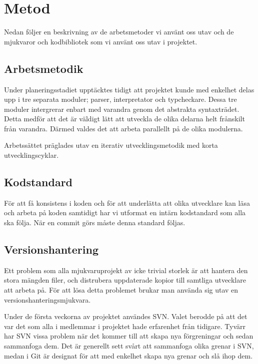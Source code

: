 \section{Metod} 

Nedan följer en beskrivning av de arbetsmetoder vi använt oss utav och de mjukvaror och kodbibliotek som vi använt oss utav i projektet. 

\subsection{Arbetsmetodik}

Under planeringsstadiet upptäcktes tidigt att projektet kunde med enkelhet delas upp i tre separata moduler; parser, interpretator och typcheckare. Dessa tre moduler intergrerar enbart med varandra genom det abstrakta syntaxträdet. Detta medför att det är väldigt lätt att utveckla de olika delarna helt frånskilt från varandra. Därmed valdes det att arbeta parallellt på de olika modulerna. 

Arbetssättet präglades utav en iterativ utvecklingsmetodik med korta utvecklingscyklar.   

\subsection{Kodstandard} 
För att få konsistens i koden och för att underlätta att olika utvecklare kan läsa och arbeta på koden samtidigt har vi utformat en intärn kodstandard \citep{fang01} som alla ska följa.
När en commit görs måste denna standard följas.

\subsection{Versionshantering} 
Ett problem som alla mjukvaruprojekt av icke trivial storlek är att hantera den stora mängden filer, och distrubera uppdaterade kopior till samtliga utvecklare att arbeta på.
För att lösa detta problemet brukar man använda sig utav en versionshanteringsmjukvara. 

Under de första veckorna av projektet användes SVN. Valet berodde på att det var det som alla i medlemmar i projektet hade erfarenhet från tidigare. Tyvärr har SVN vissa problem när det kommer till att skapa nya förgreningar och sedan sammanfoga dem. Det är generellt sett svårt att sammanfoga olika grenar i SVN, medan i Git är designat för att med enkelhet skapa nya grenar och slå ihop dem.

